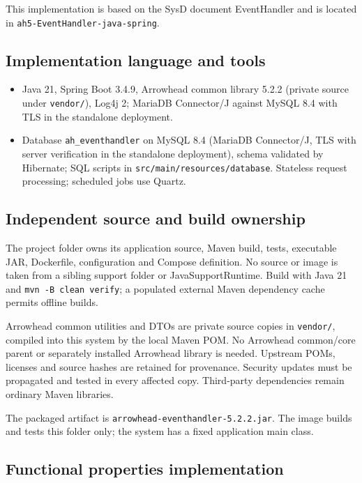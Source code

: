 \documentclass[a4paper]{arrowhead}
\begin{document}
This implementation is based on the SysD document EventHandler \cite{eh-sysd} and is located in \texttt{ah5-EventHandler-java-spring}.

\subsection{Implementation language and tools}
\begin{itemize}
\item Java 21, Spring Boot 3.4.9, Arrowhead common library 5.2.2 (private source under \texttt{vendor/}), Log4j 2; MariaDB Connector/J against MySQL 8.4 with TLS in the standalone deployment.
\item Database \texttt{ah\_\allowbreak{}eventhandler} on MySQL 8.4 (MariaDB Connector/J, TLS with server verification in the standalone deployment), schema validated by Hibernate; SQL scripts in \texttt{src/\allowbreak{}main/\allowbreak{}resources/\allowbreak{}database}. Stateless request processing; scheduled jobs use Quartz.
\end{itemize}

\subsection{Independent source and build ownership}
The project folder owns its application source, Maven build, tests, executable JAR, Dockerfile, configuration and Compose definition. No source or image is taken from a sibling support folder or JavaSupportRuntime. Build with Java 21 and \texttt{mvn -B clean verify}; a populated external Maven dependency cache permits offline builds.

Arrowhead common utilities and DTOs are private source copies in \texttt{vendor/}, compiled into this system by the local Maven POM. No Arrowhead common/core parent or separately installed Arrowhead library is needed. Upstream POMs, licenses and source hashes are retained for provenance. Security updates must be propagated and tested in every affected copy. Third-party dependencies remain ordinary Maven libraries.

The packaged artifact is \texttt{arrowhead-\allowbreak{}eventhandler-5.2.2.jar}. The image builds and tests this folder only; the system has a fixed application main class.

\subsection{Functional properties implementation}
\end{document}
